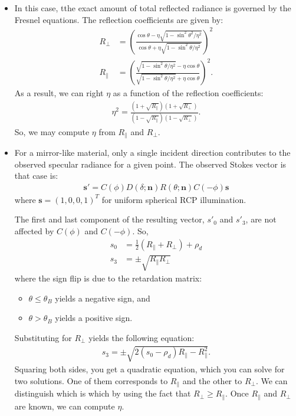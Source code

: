 \documentclass[10pt]{article}
\newcommand{\ve}[1]{\mathbf{#1}}
\begin{document}
    \begin{itemize}
      \item In this case, tthe exact amount of total reflected radiance is governed by the Fresnel equations.  The reflection coefficients are given by:
      \begin{align*}
        R_{\perp} &= \left( \frac{\cos\theta - \eta \sqrt{1 - \sin^2\theta^2/\eta^2 }}{\cos\theta + \eta \sqrt{1 - \sin^2 \theta/\eta^2 }} \right) ^2 \\
        R_{\parallel} &= \left( \frac{\sqrt{1 - \sin^2 \theta / \eta^2} - \eta \cos\theta }{ \sqrt{1 - \sin^2 \theta / \eta^2} + \eta \cos\theta } \right)^2.
      \end{align*}
      As a result, we can right $\eta$ as a function of the reflection coefficients:
      \begin{align*}
        \eta^2 = \frac{(1 + \sqrt{R_{\parallel}})(1 + \sqrt{R_{\perp}})}{(1 - \sqrt{R_{\parallel}})(1 - \sqrt{R_{\perp}})}.        
      \end{align*}
      So, we may compute $\eta$ from $R_{\parallel}$ and $R_\perp$.

      \item For a mirror-like material, only a single incident direction contributes to the observed specular radiance for a given point.  The observed Stokes vector is that case is:
      \begin{align*}
        \ve{s}' = C(\phi) D(\delta; \ve{n}) R(\theta; \ve{n}) C(-\phi) \ve{s}
      \end{align*}
      where $\ve{s} = (1,0,0,1)^T$ for uniform spherical RCP illumination.

      The first and last component of the resulting vector, $s'_0$ and $s'_3$, are not affected by $C(\phi)$ and $C(-\phi)$.  So,
      \begin{align*}
        s_0 &= \frac{1}{2} (R_\parallel + R_\perp) + \rho_d \\
        s_3 &= \pm \sqrt{R_\parallel R_\perp}
      \end{align*}
      where the sign flip is due to the retardation matrix:
      \begin{itemize}
        \item $\theta \leq \theta_B$ yields a negative sign, and
        \item $\theta > \theta_B$ yields a positive sign.
      \end{itemize}
      Substituting for $R_\perp$ yields the following equation:
      \begin{align*}
        s_3 = \pm \sqrt{2 (s_0 - \rho_d) R_\parallel - R_\parallel^2}.
      \end{align*}
      Squaring both sides, you get a quadratic equation, which you can solve for two solutions.  One of them corresponds to $R_\parallel$ and the other to $R_\perp$.  We can distinguish which is which by using the fact that $R_\perp \geq R_\parallel$.  Once $R_\parallel$ and $R_\perp$ are known, we can compute $\eta$.
    \end{itemize}
\end{document}
